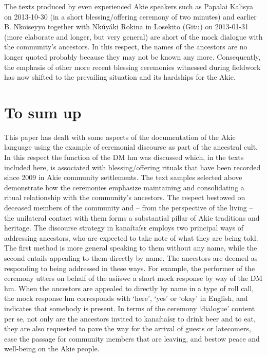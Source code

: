 \documentclass[output=paper,colorlinks,citecolor=brown]{langscibook}
\begin{document}
The texts produced by even experienced Akie speakers such as Papalai Kalisya on 2013-10-30 (in a short blessing/offering ceremony of two minutes) and earlier B. Nkoiseyyo together with Nkúyáki Rokina in Losekito (Gitu) on 2013-01-31 (more elaborate and longer, but very general) are short of the mock dialogue with the community’s ancestors. In this respect, the names of the ancestors are no longer quoted probably because they may not be known any more. Consequently, the emphasis of other more recent blessing ceremonies witnessed during fieldwork has now shifted to the prevailing situation and its hardships for the Akie.

\section{To sum up}\label{sec:legere:5}

This paper has dealt with some aspects of the documentation of the Akie language using the example of ceremonial discourse as part of the ancestral cult.  In this respect the function of the DM hm was discussed which, in the texts included here, is associated with blessing/offering rituals that have been recorded since 2009 in Akie community settlements. 
The text samples selected above demonstrate how the ceremonies emphasize maintaining and consolidating a ritual relationship with the community’s ancestors. The respect bestowed on deceased members of the community and – from the perspective of the living – the unilateral contact with them forms a substantial pillar of Akie traditions and heritage.
The discourse strategy in kanaítaísɛ employs two principal ways of addressing ancestors, who are expected to take note of what they are being told. The first method is more general speaking to them without any name, while the second entails appealing to them directly by name. The ancestors are deemed as responding to being addressed in these ways. For example, the performer of the ceremony utters on behalf of the asííswe a short mock response by way of the DM hm. When the ancestors are appealed to directly by name in a type of roll call, the mock response hm corresponds with ‘here’, ‘yes’ or ‘okay’ in English, and indicates that somebody is present. In terms of the ceremony ‘dialogue’ content per se, not only are the ancestors invited to kanaítaísɛ to drink beer and to eat, they are also requested to pave the way for the arrival of guests or latecomers, ease the passage for community members that are leaving, and bestow peace and well-being on the Akie people.
\end{document}
